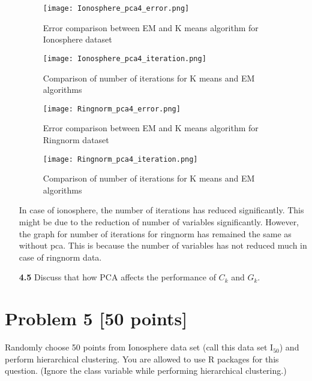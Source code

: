 \documentclass{article}
\begin{document}
\begin{enumerate}
 \begin{figure}[H]
       \texttt{[image: Ionosphere\_pca4\_error.png]}
       \caption{Error comparison between EM and K means algorithm for Ionosphere dataset}
      \end{figure}

      \begin{figure}[H]
        \texttt{[image: Ionosphere\_pca4\_iteration.png]}
        \caption{Comparison of number of iterations for K means and EM algorithms}
      \end{figure}
    
    \begin{figure}[H]
      \texttt{[image: Ringnorm\_pca4\_error.png]}
      \caption{Error comparison between EM and K means algorithm for Ringnorm dataset}
  	\end{figure}
    
    \begin{figure}[H]
      \texttt{[image: Ringnorm\_pca4\_iteration.png]}
      \caption{Comparison of number of iterations for K means and EM algorithms}
  	\end{figure}
    
In case of ionosphere, the number of iterations has reduced significantly. This might be due to the reduction of number of variables significantly. However, the graph for number of iterations for ringnorm has remained the same as without pca. This is because the number of variables has not reduced much in case of ringnorm data.

 
  \item[\textbf{4.5}] Discuss that how PCA affects the performance of $C_k$ and $G_k$.  
\end{enumerate}



 
 \section*{Problem 5 [50 points]}  Randomly choose 50 points from Ionosphere data set (call this data set $\text{I}_{50}$) and perform hierarchical clustering. You are allowed to use R packages for this question. (Ignore the class variable while performing hierarchical clustering.)
 \\ 
 
\end{document}
